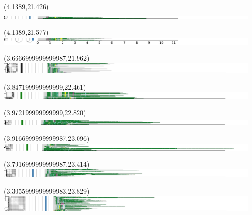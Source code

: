\documentclass{article}
\begin{document}
\begin{textblock}{13}(4.1389,21.426)\includegraphics{latex/figures/haplotypes-constrained/14qtel_1-500K_1_12_12_rc-HG006.pdf}\end{textblock}
\begin{textblock}{13}(4.1389,21.577)\includegraphics{latex/figures/haplotypes-constrained/14qtel_1-500K_1_12_12_rc-HG007.pdf}\end{textblock}
\begin{textblock}{13}(3.6666999999999987,21.962)\includegraphics{latex/figures/haplotypes-constrained/chr15-HG001.pdf}\end{textblock}
\begin{textblock}{13}(3.847199999999999,22.461)\includegraphics{latex/figures/haplotypes-constrained/chr15-HG002.pdf}\end{textblock}
\begin{textblock}{13}(3.972199999999999,22.820)\includegraphics{latex/figures/haplotypes-constrained/chr15-HG003.pdf}\end{textblock}
\begin{textblock}{13}(3.9166999999999987,23.096)\includegraphics{latex/figures/haplotypes-constrained/chr15-HG004.pdf}\end{textblock}
\begin{textblock}{13}(3.7916999999999987,23.414)\includegraphics{latex/figures/haplotypes-constrained/chr15-HG005.pdf}\end{textblock}
\begin{textblock}{13}(3.3055999999999983,23.829)\includegraphics{latex/figures/haplotypes-constrained/chr15-HG006.pdf}\end{textblock}
\end{document}
